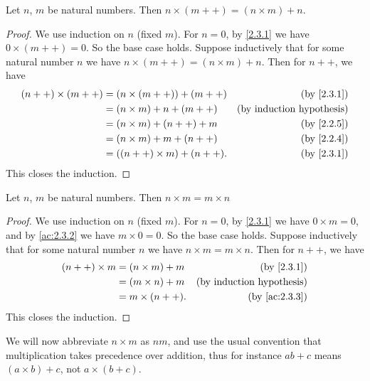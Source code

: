 \begin{ac}\label{ac:2.3.3}
  Let \(n\), \(m\) be natural numbers.
  Then \(n \times (m++) = (n \times m) + n\).
\end{ac}

\begin{proof}
  We use induction on \(n\) (fixed \(m\)).
  For \(n = 0\), by \cref{2.3.1} we have \(0 \times (m++) = 0\).
  So the base case holds.
  Suppose inductively that for some natural number \(n\) we have \(n \times (m++) = (n \times m) + n\).
  Then for \(n++\), we have
  \begin{align*}
    (n++) \times (m++)
     & = (n \times (m++)) + (m++)  & \text{(by \cref{2.3.1})}         \\
     & = (n \times m) + n + (m++)  & \text{(by induction hypothesis)} \\
     & = (n \times m) + (n++) + m  & \text{(by \cref{2.2.5})}         \\
     & = (n \times m) + m + (n++)  & \text{(by \cref{2.2.4})}         \\
     & = ((n++) \times m) + (n++). & \text{(by \cref{2.3.1})}
  \end{align*}
  This closes the induction.
\end{proof}

\begin{lem}\label{2.3.2}
  Let \(n\), \(m\) be natural numbers.
  Then \(n \times m = m \times n\)
\end{lem}

\begin{proof}
  We use induction on \(n\) (fixed \(m\)).
  For \(n = 0\), by \cref{2.3.1} we have \(0 \times m = 0\), and by \cref{ac:2.3.2} we have \(m \times 0 = 0\).
  So the base case holds.
  Suppose inductively that for some natural number \(n\) we have \(n \times m = m \times n\).
  Then for \(n++\), we have
  \begin{align*}
    (n++) \times m & = (n \times m) + m & \text{(by \cref{2.3.1})}         \\
                   & = (m \times n) + m & \text{(by induction hypothesis)} \\
                   & = m \times (n++).  & \text{(by \cref{ac:2.3.3})}
  \end{align*}
  This closes the induction.
\end{proof}

\begin{note}
  We will now abbreviate \(n \times m\) as \(nm\), and use the usual convention that multiplication takes precedence over addition, thus for instance \(ab + c\) means \((a \times b) + c\), not \(a \times (b + c)\).
\end{note}

